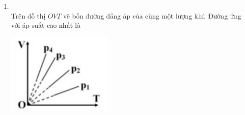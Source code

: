 \begin{enumerate}[label=\bfseries Câu \arabic*:, leftmargin=1.7cm]
\item {}\\
Trên đồ thị $OVT$ vẽ bốn đường đẳng áp của cùng một lượng khí. Đường ứng với áp suất cao nhất là
\begin{center}
	\includegraphics[width=0.2\linewidth]{../figs/VN12-Y24-PH-SYL-012P-2}
\end{center}



\end{enumerate}
